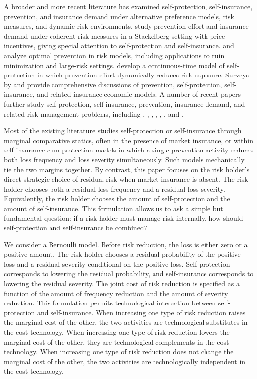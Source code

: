 \documentclass[a4paper,12pt]{article}
\begin{document}
A broader and more recent literature has examined self-protection, self-insurance, prevention, and insurance demand under alternative preference models, risk measures, and dynamic risk environments. \cite{BensalemHernandezSantibanezKaziTani2020} study prevention effort and insurance demand under coherent risk measures in a Stackelberg setting with price incentives, giving special attention to self-protection and self-insurance. \cite{GauchonLoiselRulliereTrufin2020} and \cite{GauchonLoiselRulliereTrufin2021} analyze optimal prevention in risk models, including applications to ruin minimization and large-risk settings. \cite{BensalemHernandezSantibanezKaziTani2023} develop a continuous-time model of self-protection in which prevention effort dynamically reduces risk exposure. Surveys by \cite{CourbagePeterReyTreich2025} and \cite{Peter2025} provide comprehensive discussions of prevention, self-protection, self-insurance, and related insurance-economic models. A number of recent papers further study self-protection, self-insurance, prevention, insurance demand, and related risk-management problems, including \cite{BoonenNgNguyen2025}, \cite{BoonenZheng2025b}, \cite{ChenZhangZhu2025SSRN}, \cite{ChongFengHuZhang2025CyberRisk}, \cite{BoonenZheng2025a}, \cite{ChenZhangZhu2025EJOR}, and \cite{LiWangZhang2025}.

Most of the existing literature studies self-protection or self-insurance through marginal comparative statics, often in the presence of market insurance, or within self-insurance-cum-protection models in which a single prevention activity reduces both loss frequency and loss severity simultaneously. Such models mechanically tie the two margins together. By contrast, this paper focuses on the risk holder's direct strategic choice of residual risk when market insurance is absent. The risk holder chooses both a residual loss frequency and a residual loss severity. Equivalently, the risk holder chooses the amount of self-protection and the amount of self-insurance. This formulation allows us to ask a simple but fundamental question: if a risk holder must manage risk internally, how should self-protection and self-insurance be combined?

We consider a Bernoulli model. Before risk reduction, the loss is either zero or a positive amount. The risk holder chooses a residual probability of the positive loss and a residual severity conditional on the positive loss. Self-protection corresponds to lowering the residual probability, and self-insurance corresponds to lowering the residual severity. The joint cost of risk reduction is specified as a function of the amount of frequency reduction and the amount of severity reduction. This formulation permits technological interaction between self-protection and self-insurance. When increasing one type of risk reduction raises the marginal cost of the other, the two activities are technological substitutes in the cost technology. When increasing one type of risk reduction lowers the marginal cost of the other, they are technological complements in the cost technology. When increasing one type of risk reduction does not change the marginal cost of the other, the two activities are technologically independent in the cost technology.
\end{document}
